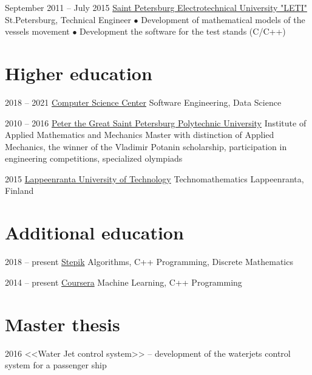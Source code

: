 \documentclass[11pt,a4paper]{moderncv}
\def\mark{{\tiny$\bullet$} }
\begin{document}
\cventry
    {September 2011 -- July 2015} %
    {\href{https://etu.ru/}{Saint Petersburg Electrotechnical University "LETI"}}
    {\newline St.Petersburg, Technical Engineer}
    {}
    {}
    {
        \mark Development of mathematical models of the vessels movement
        \newline
        \mark Development the software for the test stands (C/C++)
    }

\section{Higher education}
\cventry
    {2018 -- 2021}
    {\href{https://compscicenter.ru/users/4612/}
    {Computer Science Center}}
    {Software Engineering, Data Science}
    {}
    {}
    {}

\cventry
    {2010 -- 2016}
    {\href{http://www.spbstu.ru/}{Peter the Great Saint Petersburg Polytechnic University}}
    {\newline Institute of Applied Mathematics and Mechanics}
    {\newline Master with distinction of Applied Mechanics,
    \newline the winner of the Vladimir Potanin scholarship,
    participation in engineering competitions, specialized olympiads}
    {}
    {}

\cventry
    {2015}
    {\href{https://www.lut.fi/web/en/}{Lappeenranta University of Technology}}
    {Technomathematics}
    {}
    {}
    {Lappeenranta, Finland}
    
\section{Additional education}
\cventry
    {2018 -- present}
    {\href{https://stepik.org/users/57620777}{Stepik}}
    {Algorithms, C++ Programming, Discrete Mathematics}
    {}
    {}
    {}

\cventry
    {2014 -- present}
    {\href{https://www.coursera.org/user/6824f02bb7dea6b34f4c85686333f84c}{Coursera}}
    {Machine Learning, C++ Programming}
    {}
    {}
    {}

\pagebreak

\section{Master thesis}
\cvline
    {2016}
    {<<Water Jet control system>> -- development of the waterjets control system for a passenger ship}
\end{document}
